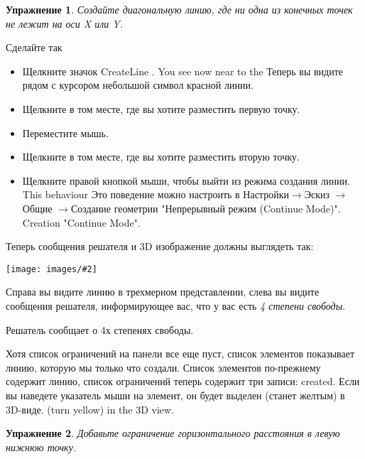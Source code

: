 \documentclass[12pt,titlepage]{article}
\newcommand{\menu}{\mbox{$\rightarrow$}}
\newcommand{\icon}[1]{\raisebox{-1em}{\rule{0pt}{27pt}\texttt{[image: images/\#1]}}}
\newcommand{\img}[2]{\vspace{2ex}\noindent\texttt{[image: images/\#2]}}
\newcommand{\imgTop}[2]{\raisebox{0ex}{\texttt{[image: images/\#2]}}}
\newtheorem{Exercise}{Упражнение}
\begin{document}
\pagebreak[3]
\begin{Exercise}
Создайте диагональную линию, где ни одна из конечных точек не лежит на оси X или Y.
\end{Exercise}

Сделайте так 
\begin{itemize}
\item Щелкните значок CreateLine \icon{Sketcher_CreateLine}. You see now near to the
      Теперь вы видите рядом с курсором небольшой символ красной линии.
\item Щелкните в том месте, где вы хотите разместить первую точку.
\item Переместите мышь.
\item Щелкните в том месте, где вы хотите разместить вторую точку.
\item Щелкните правой кнопкой мыши, чтобы выйти из режима создания линии. This behaviour
      Это поведение можно настроить в Настройки\menu Эскиз \menu Общие \menu Создание геометрии "Непрерывный режим (Continue Mode)".
      Creation "Continue Mode".
\end{itemize}

Теперь сообщения решателя и 3D изображение должны выглядеть так:

\img{scale=0.9}{Exercise1}

Справа вы видите линию в трехмерном представлении, слева вы видите сообщения решателя, информирующее вас, что у вас есть \emph {4 степени свободы}.
\item Решатель сообщает о 4х степенях свободы.

\imgTop{scale=1}{ElementsLine}
\hspace{1em}
\parbox[t]{0.34\textwidth}{
Хотя список ограничений на панели все еще пуст, список элементов \label{ListOfElements1} показывает линию, которую мы только что создали.
\label{ListOfElements2}Список элементов по-прежнему содержит линию, список ограничений теперь содержит три записи:
created. Если вы наведете указатель мыши на элемент, он будет выделен (станет желтым) в 3D-виде.
(turn yellow) in the 3D view.
}

\begin{Exercise}
\label{ExerciseHorizontalDistance}
Добавьте ограничение горизонтального расстояния в левую нижнюю точку.
\end{Exercise}
\end{document}
